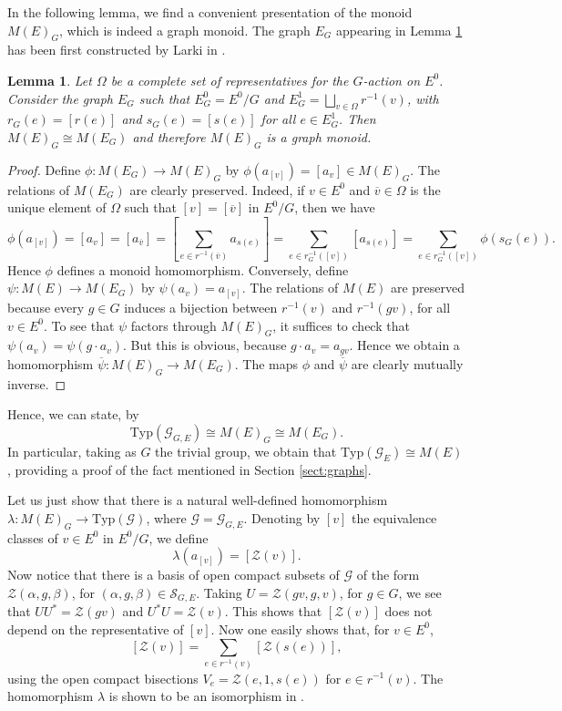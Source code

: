 \documentclass[11pt]{amsart}
\def\ol{\overline}
\theoremstyle{plain}            %
\newtheorem{lemma}[theorem]{Lemma}
\theoremstyle{definition}       %
\theoremstyle{definition}       %
\theoremstyle{remark}
\newcommand{\Typ}{\mathrm{Typ}}
\begin{document}
In the following lemma, we find a convenient presentation of the monoid $M(E)_G$, which is indeed a graph monoid. The graph $E_G$ appearing in Lemma \ref{lem:coinvariants} has been first constructed by Larki in \cite{Larki}.


\begin{lemma}
	\label{lem:coinvariants}
	Let $\Omega$ be a complete set of representatives for the $G$-action on $E^0$.
	Consider the graph $E_G$ such that $E_G^0=E^0/G$ and $E_G^1 = \bigsqcup_{v\in \Omega} r^{-1} (v)$, with $r_G(e)=[r(e)]$ and $s_G(e) = [s(e)]$ for all $e\in E_G^1$. Then $M(E)_G\cong M(E_G)$ and therefore $M(E)_G$ is a graph monoid.
\end{lemma}


\begin{proof}  
	Define $\phi\colon M(E_G)\to M(E)_G$ by $\phi (a_{[v]}) = [a_v]\in M(E)_G$. The relations of $M(E_G)$ are clearly preserved. Indeed, if $v\in E^0$ and $\ol{v}\in \Omega$ is the unique element of $\Omega$ such that $[v]=[\ol{v}]$ in $E^0/G$, then we have
	$$\phi (a_{[v]}) = [a_v] = [a_{\ol{v}}] = [\sum _{e\in r^{-1}(\ol{v})} a_{s(e)}] = \sum_{e\in r_G^{-1}([v])} [a_{s(e)}] = \sum _{e\in r_G^{-1}([v])} \phi (s_G (e)).$$
	Hence $\phi$ defines a monoid homomorphism. Conversely, define $\psi \colon M(E)\to M(E_G)$
	by $\psi (a_v)= a_{[v]}$. The relations of $M(E)$ are preserved because every  $g\in G$ induces a bijection between $r^{-1}(v)$ and $r^{-1}(gv)$, for all $v\in E^0$. To see that $\psi$ factors through $M(E)_G$, it suffices to check that $\psi (a_v) = \psi (g\cdot a_v)$. But this is obvious, because $g\cdot a_v = a_{gv}$. 
    Hence we obtain a homomorphism $\ol{\psi}\colon M(E)_G\to M(E_G)$. 
    The maps $\phi$ and $\ol{\psi}$ are clearly mutually inverse.   
\end{proof}


Hence, we can state, by \cite[Proposition 7.7]{KMP25}
\begin{equation}
	\label{eq:type-semigroup-ssactions}
	\Typ (\mathcal G_{G,E}) \cong M(E)_G\cong M(E_G).
\end{equation} 
In particular, taking as $G$ the trivial group, we obtain that $\Typ (\mathcal G _E) \cong M(E)$, providing a proof of the fact mentioned in Section \ref{sect:graphs}.

Let us just show that there is a natural well-defined homomorphism $\lambda \colon M(E)_G\to \Typ (\mathcal G)$, where $\mathcal G = \mathcal G_{G,E}$. Denoting by $[v]$ the equivalence classes of $v\in E^0$ in $E^0/G$, we define 
$$\lambda (a_{[v]}) = [\mathcal Z (v)].$$
Now notice that there is a basis of open compact subsets of $\mathcal G$ of the form $\mathcal Z (\alpha,g,\beta)$, for $(\alpha,g,\beta)\in \mathcal S_{G,E}$. 
Taking $U=\mathcal Z (gv,g,v)$, for $g\in G$, we see that $UU^*= \mathcal Z (gv)$ and $U^*U=\mathcal Z (v)$.
This shows that $[\mathcal Z (v)]$ does not depend on the representative of $[v]$. 
Now one easily shows that, for $v\in E^0$, 
$$[\mathcal Z (v)] = \sum _{e\in r^{-1}(v)} [\mathcal Z (s(e))],$$
using the open compact bisections $V_e= \mathcal Z (e, 1, s(e))$ for $e\in r^{-1}(v)$. The homomorphism $\lambda$ is shown to be an isomorphism in \cite[Proposition 7.7]{KMP25}.
\end{document}
